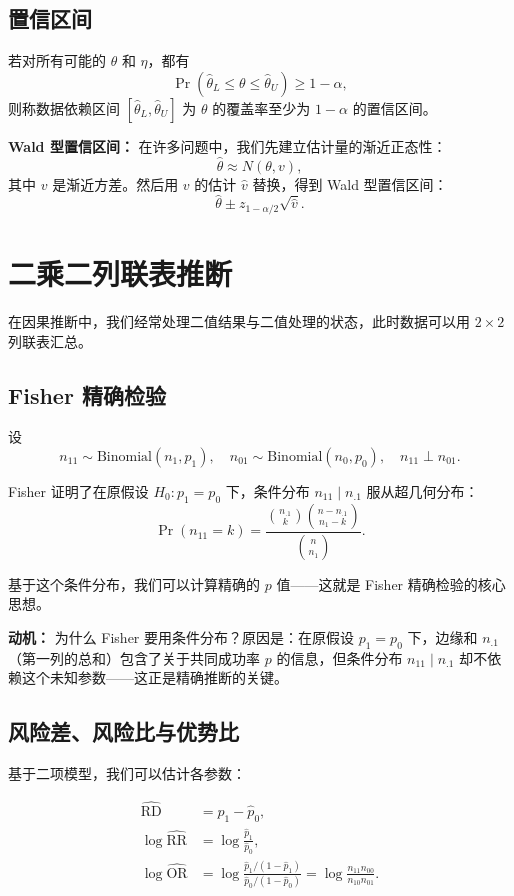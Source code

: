 \subsection{置信区间}

\begin{Definition}[置信区间]\label{def:confidence-interval}
若对所有可能的 $\theta$ 和 $\eta$，都有
\[
\Pr(\hat{\theta}_L \leq \theta \leq \hat{\theta}_U) \geq 1 - \alpha,
\]
则称数据依赖区间 $[\hat{\theta}_L, \hat{\theta}_U]$ 为 $\theta$ 的覆盖率至少为 $1-\alpha$ 的置信区间。
\end{Definition}

\textbf{Wald 型置信区间：} 在许多问题中，我们先建立估计量的渐近正态性：
\[
\hat{\theta} \approx N(\theta, v),
\]
其中 $v$ 是渐近方差。然后用 $v$ 的估计 $\hat{v}$ 替换，得到 Wald 型置信区间：
\[
\hat{\theta} \pm z_{1-\alpha/2}\sqrt{\hat{v}} .
\]

\section{二乘二列联表推断}

在因果推断中，我们经常处理二值结果与二值处理的状态，此时数据可以用 $2 \times 2$ 列联表汇总。

\subsection{Fisher 精确检验}

设
\[
n_{11} \sim \text{Binomial}(n_1, p_1), \quad n_{01} \sim \text{Binomial}(n_0, p_0), \quad n_{11} \perp n_{01}.
\]

Fisher 证明了在原假设 $H_0: p_1 = p_0$ 下，条件分布 $n_{11} \mid n_{.1}$ 服从超几何分布：
\[
\Pr(n_{11} = k) = \frac{\binom{n_{.1}}{k}\binom{n - n_{.1}}{n_1 - k}}{\binom{n}{n_1}} .
\]

基于这个条件分布，我们可以计算精确的 $p$ 值——这就是 Fisher 精确检验的核心思想。

\textbf{动机：} 为什么 Fisher 要用条件分布？原因是：在原假设 $p_1 = p_0$ 下，边缘和 $n_{.1}$（第一列的总和）包含了关于共同成功率 $p$ 的信息，但条件分布 $n_{11} \mid n_{.1}$ 却不依赖这个未知参数——这正是精确推断的关键。

\subsection{风险差、风险比与优势比}

基于二项模型，我们可以估计各参数：

\begin{align}
\widehat{\text{RD}} &= \hat{p}_1 - \hat{p}_0, \label{eq:risk-diff} \\
\log\widehat{\text{RR}} &= \log\frac{\hat{p}_1}{\hat{p}_0}, \label{eq:log-risk-ratio} \\
\log\widehat{\text{OR}} &= \log\frac{\hat{p}_1/(1-\hat{p}_1)}{\hat{p}_0/(1-\hat{p}_0)} = \log\frac{n_{11}n_{00}}{n_{10}n_{01}} . \label{eq:log-odds-ratio}
\end{align}

